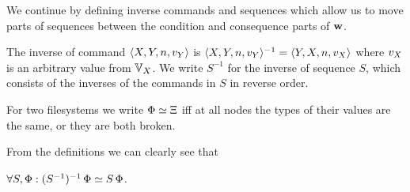 \bigskip

\noindent
We continue by defining inverse commands and sequences
which allow us to move parts of sequences between the
condition and consequence parts of $\mathbf{w}$.

\begin{mydef}
The inverse of command $\langle{X,Y,n,v_Y}\rangle$ is $\langle{X,Y,n,v_Y}\rangle^{-1} = \langle{Y,X,n,v_X}\rangle$
where $v_X$ is an arbitrary value from $\mathbb{V}_{X}$.
We write $S^{-1}$ for the inverse of sequence $S$, which consists of the inverses of the commands in $S$
in reverse order.
\end{mydef}

\begin{mydef}[$\typeeq$]
For two filesystems we write $\Phi\simeq\Xi$
iff 
at all nodes the types of their values are the same, or they are both broken.
\end{mydef}

From the definitions we can clearly see that
\begin{mycor}\label{negneg_is_typeeq}
$\forall S, \Phi: (S^{-1})^{-1}\,\Phi\simeq S\,\Phi$.
\end{mycor}

